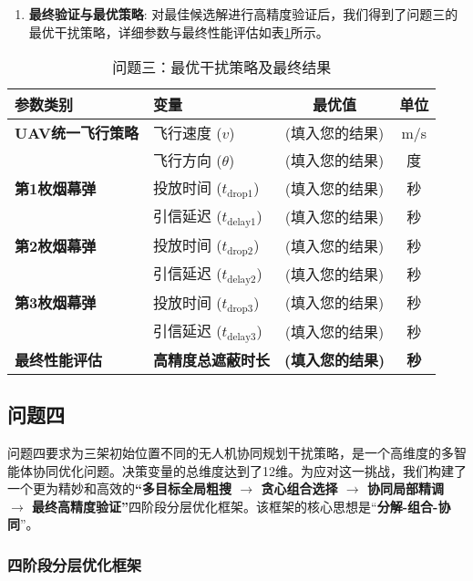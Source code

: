 \documentclass[12pt]{article}
\begin{document}
\begin{CJK}{UTF8}{gbsn}
\begin{enumerate}
		
		\item \textbf{最终验证与最优策略}: 对最佳候选解进行高精度验证后，我们得到了问题三的最优干扰策略，详细参数与最终性能评估如表\ref{tab:results_q3}所示。
	\end{enumerate}
	
	\begin{table}[H]
		\centering
		\caption{问题三：最优干扰策略及最终结果}
		\label{tab:results_q3}
		\begin{tabular}{@{}llcc@{}}
			\toprule
			参数类别           & 变量                & 最优值      & 单位 \\ \midrule
			\textbf{UAV统一飞行策略} & 飞行速度 ($v$)        & (填入您的结果) & m/s  \\
			& 飞行方向 ($\theta$)     & (填入您的结果) & 度   \\ \midrule
			\textbf{第1枚烟幕弹} & 投放时间 ($t_{\text{drop1}}$) & (填入您的结果) & 秒   \\
			& 引信延迟 ($t_{\text{delay1}}$) & (填入您的结果) & 秒   \\ \midrule
			\textbf{第2枚烟幕弹} & 投放时间 ($t_{\text{drop2}}$) & (填入您的结果) & 秒   \\
			& 引信延迟 ($t_{\text{delay2}}$) & (填入您的结果) & 秒   \\ \midrule
			\textbf{第3枚烟幕弹} & 投放时间 ($t_{\text{drop3}}$) & (填入您的结果) & 秒   \\
			& 引信延迟 ($t_{\text{delay3}}$) & (填入您的结果) & 秒   \\ \midrule
			\textbf{最终性能评估} & \textbf{高精度总遮蔽时长} & \textbf{(填入您的结果)} & \textbf{秒}   \\ \bottomrule
		\end{tabular}
	\end{table}
	
	\subsection{问题四}
	
	
	问题四要求为三架初始位置不同的无人机协同规划干扰策略，是一个高维度的多智能体协同优化问题。决策变量的总维度达到了12维。为应对这一挑战，我们构建了一个更为精妙和高效的\textbf{“多目标全局粗搜 $\rightarrow$ 贪心组合选择 $\rightarrow$ 协同局部精调 $\rightarrow$ 最终高精度验证”}四阶段分层优化框架。该框架的核心思想是“\textbf{分解-组合-协同}”。
	
	\subsubsection{四阶段分层优化框架}

\end{CJK}
\end{document}
